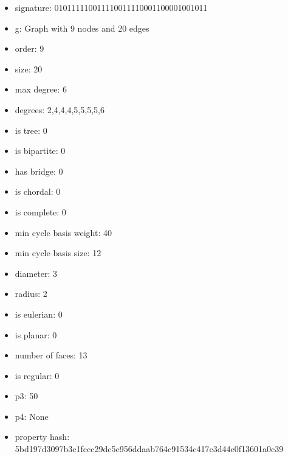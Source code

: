 \newpage
\begin{figure}
\end{figure}
\begin{itemize}
\item signature: 010111110011110011110001100001001011
\item g: Graph with 9 nodes and 20 edges
\item order: 9
\item size: 20
\item max degree: 6
\item degrees: 2,4,4,4,5,5,5,5,6
\item is tree: 0
\item is bipartite: 0
\item has bridge: 0
\item is chordal: 0
\item is complete: 0
\item min cycle basis weight: 40
\item min cycle basis size: 12
\item diameter: 3
\item radius: 2
\item is eulerian: 0
\item is planar: 0
\item number of faces: 13
\item is regular: 0
\item p3: 50
\item p4: None
\item property hash: 5bd197d3097b3c1fccc29dc5c956ddaab764c91534c417c3d44e0f13601a0c39
\end{itemize}
